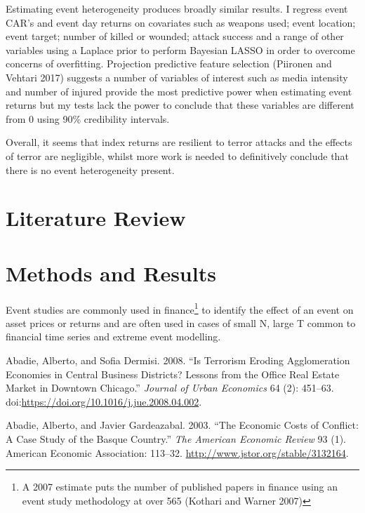 \documentclass[]{AEA}
\begin{document}
Estimating event heterogeneity produces broadly similar results. I
regress event CAR's and event day returns on covariates such as weapons
used; event location; event target; number of killed or wounded; attack
success and a range of other variables using a Laplace prior to perform
Bayesian LASSO in order to overcome concerns of overfitting. Projection
predictive feature selection (Piironen and Vehtari 2017) suggests a
number of variables of interest such as media intensity and number of
injured provide the most predictive power when estimating event returns
but my tests lack the power to conclude that these variables are
different from 0 using 90\% credibility intervals.

Overall, it seems that index returns are resilient to terror attacks and
the effects of terror are negligible, whilst more work is needed to
definitively conclude that there is no event heterogeneity present.

\section{Literature Review}

\section{Methods and Results}

Event studies are commonly used in finance\footnote{A 2007 estimate puts
  the number of published papers in finance using an event study
  methodology at over 565 (Kothari and Warner 2007)} to identify the
effect of an event on asset prices or returns and are often used in
cases of small N, large T common to financial time series and extreme
event modelling.



\appendix

\hypertarget{refs}{}
\hypertarget{ref-ABADIE2008451}{}
Abadie, Alberto, and Sofia Dermisi. 2008. ``Is Terrorism Eroding
Agglomeration Economies in Central Business Districts? Lessons from the
Office Real Estate Market in Downtown Chicago.'' \emph{Journal of Urban
Economics} 64 (2): 451--63.
doi:\href{https://doi.org/https://doi.org/10.1016/j.jue.2008.04.002}{https://doi.org/10.1016/j.jue.2008.04.002}.

\hypertarget{ref-10.2307ux2f3132164}{}
Abadie, Alberto, and Javier Gardeazabal. 2003. ``The Economic Costs of
Conflict: A Case Study of the Basque Country.'' \emph{The American
Economic Review} 93 (1). American Economic Association: 113--32.
\url{http://www.jstor.org/stable/3132164}.
\end{document}
